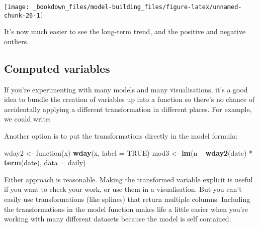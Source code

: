 \documentclass[]{book}
\newenvironment{Shaded}{\begin{snugshade}}{\end{snugshade}}
\newcommand{\KeywordTok}[1]{\textcolor[rgb]{0.13,0.29,0.53}{\textbf{{#1}}}}
\newcommand{\DataTypeTok}[1]{\textcolor[rgb]{0.13,0.29,0.53}{{#1}}}
\newcommand{\StringTok}[1]{\textcolor[rgb]{0.31,0.60,0.02}{{#1}}}
\newcommand{\OtherTok}[1]{\textcolor[rgb]{0.56,0.35,0.01}{{#1}}}
\newcommand{\NormalTok}[1]{{#1}}
\begin{document}
\begin{center}\texttt{[image: \_bookdown\_files/model-building\_files/figure-latex/unnamed-chunk-26-1]} \end{center}

It's now much easier to see the long-term trend, and the positive and
negative outliers.

\subsection{Computed variables}\label{computed-variables}

If you're experimenting with many models and many visualisations, it's a
good idea to bundle the creation of variables up into a function so
there's no chance of accidentally applying a different transformation in
different places. For example, we could write:

\begin{Shaded}
\end{Shaded}

Another option is to put the transformations directly in the model
formula:

\begin{Shaded}
\begin{Highlighting}[]
\NormalTok{wday2 <-}\StringTok{ }\NormalTok{function(x) }\KeywordTok{wday}\NormalTok{(x, }\DataTypeTok{label =} \OtherTok{TRUE}\NormalTok{)}
\NormalTok{mod3 <-}\StringTok{ }\KeywordTok{lm}\NormalTok{(n ~}\StringTok{ }\KeywordTok{wday2}\NormalTok{(date) *}\StringTok{ }\KeywordTok{term}\NormalTok{(date), }\DataTypeTok{data =} \NormalTok{daily)}
\end{Highlighting}
\end{Shaded}

Either approach is reasonable. Making the transformed variable explicit
is useful if you want to check your work, or use them in a
visualisation. But you can't easily use transformations (like splines)
that return multiple columns. Including the transformations in the model
function makes life a little easier when you're working with many
different datasets because the model is self contained.
\end{document}
